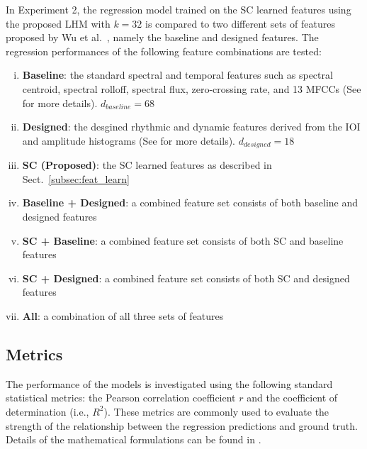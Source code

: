 \documentclass{article}
\begin{document}
In Experiment 2, the regression model trained on the SC learned features using the proposed LHM with $k = 32$ is compared to two different sets of features proposed by Wu et al.~\cite{Wu2016}, namely the baseline and designed features. The regression performances of the following feature combinations are tested:
\begin{enumerate}[(i)]
\item \textbf{Baseline}: the standard spectral and temporal features such as spectral centroid, spectral rolloff, spectral flux, zero-crossing rate, and 13 MFCCs (See \cite{Wu2016} for more details). $d_{baseline} = 68$
\item \textbf{Designed}: the desgined rhythmic and dynamic features derived from the IOI and amplitude histograms (See \cite{Wu2016} for more details). $d_{designed} = 18$
\item \textbf{SC (Proposed)}: the SC learned features as described in Sect.~\ref{subsec:feat_learn}
\item \textbf{Baseline + Designed}: a combined feature set consists of both baseline and designed features 
\item \textbf{SC + Baseline}:  a combined feature set consists of both SC and baseline features 
\item \textbf{SC + Designed}:  a combined feature set consists of both SC and designed features 
\item \textbf{All}: a combination of all three sets of features
\end{enumerate}

\subsection{Metrics}
The performance of the models is investigated using the following standard statistical metrics: the Pearson correlation coefficient $r$ and the coefficient of determination (i.e., $R^{2}$). These metrics are commonly used to evaluate the strength of the relationship between the regression predictions and ground truth. Details of the mathematical formulations can be found in \cite{McClave2003}. 
\end{document}
